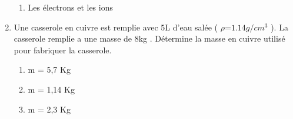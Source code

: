 \documentclass[12pt]{article}
\begin{document}
\begin{multicols}{2}
\begin{enumerate}
\begin{enumerate}
			\item Les électrons et les ions
		\end{enumerate}
	\item Une casserole en cuivre est remplie avec 5L d'eau salée ( $\rho$=$1.14 g/cm^3$ ). La casserole remplie a une masse de 8kg . Détermine la masse en cuivre utilisé pour fabriquer la casserole.
		\begin{enumerate}
	\item m = 5,7 Kg
	\item m = 1,14 Kg
	\item m = 2,3 Kg
	\end{enumerate}
	\end{enumerate}
\end{multicols}











\end{document}
